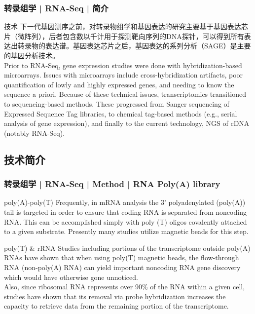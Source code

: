 \begin{frame}
  \frametitle{转录组学 | RNA-Seq | 简介}
  \begin{block}{技术}
下一代基因测序之前，对转录物组学和基因表达的研究主要基于基因表达芯片（微阵列），后者包含数以千计用于探测靶向序列的DNA探针，可以得到所有表达出转录物的表达谱。基因表达芯片之后，基因表达的系列分析（SAGE）是主要的基因分析技术。\\
\vspace{1em}
Prior to RNA-Seq, gene expression studies were done with hybridization-based microarrays. Issues with microarrays include cross-hybridization artifacts, poor quantification of lowly and highly expressed genes, and needing to know the sequence a priori. Because of these technical issues, transcriptomics transitioned to sequencing-based methods. These progressed from Sanger sequencing of Expressed Sequence Tag libraries, to chemical tag-based methods (e.g., serial analysis of gene expression), and finally to the current technology, NGS of cDNA (notably RNA-Seq).
  \end{block}
\end{frame}

\subsection{技术简介}
\begin{frame}
  \frametitle{转录组学 | RNA-Seq | Method | RNA Poly(A) library}
  \begin{block}{poly(A)-poly(T)}
    Frequently, in mRNA analysis the 3' polyadenylated (poly(A)) tail is targeted in order to ensure that coding RNA is separated from noncoding RNA. This can be accomplished simply with poly (T) oligos covalently attached to a given substrate. Presently many studies utilize magnetic beads for this step.
  \end{block}
  \pause
  \begin{block}{poly(T) \& rRNA}
    Studies including portions of the transcriptome outside poly(A) RNAs have shown that when using poly(T) magnetic beads, the flow-through RNA (non-poly(A) RNA) can yield important noncoding RNA gene discovery which would have otherwise gone unnoticed.\\
    \vspace{0.2em}
    Also, since ribosomal RNA represents over 90\% of the RNA within a given cell, studies have shown that its removal via probe hybridization increases the capacity to retrieve data from the remaining portion of the transcriptome.
  \end{block}
\end{frame}

